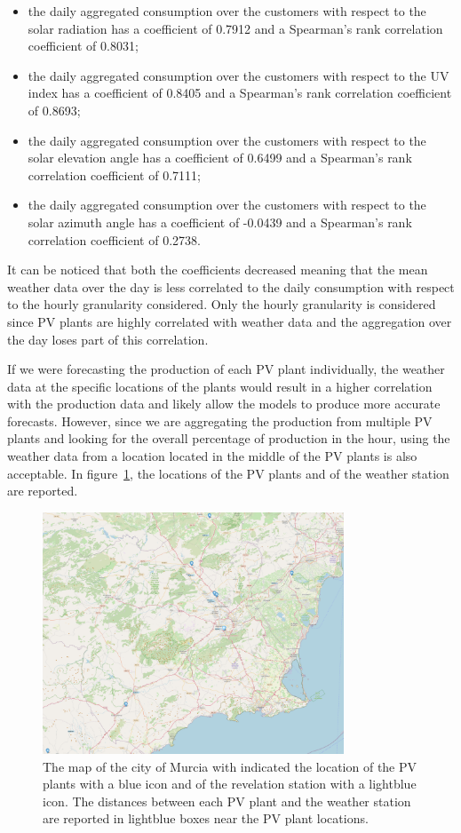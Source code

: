 \begin{itemize}
  \item the daily aggregated consumption over the customers with respect to the solar radiation has a coefficient of 0.7912 and a Spearman's rank correlation coefficient of 0.8031;
  \item the daily aggregated consumption over the customers with respect to the UV index has a coefficient of 0.8405 and a Spearman's rank correlation coefficient of 0.8693;
  \item the daily aggregated consumption over the customers with respect to the solar elevation angle has a coefficient of 0.6499 and a Spearman's rank correlation coefficient of 0.7111;
  \item the daily aggregated consumption over the customers with respect to the solar azimuth angle has a coefficient of -0.0439 and a Spearman's rank correlation coefficient of 0.2738.
\end{itemize}
It can be noticed that both the coefficients decreased meaning that the mean weather data over the day is less correlated to the daily consumption with respect to the hourly granularity considered.
Only the hourly granularity is considered since PV plants are highly correlated with weather data and the aggregation over the day loses part of this correlation.

If we were forecasting the production of each PV plant individually, the weather data at the specific locations of the plants would result in a higher correlation with the production data and likely allow the models to produce more accurate forecasts.
However, since we are aggregating the production from multiple PV plants and looking for the overall percentage of production in the hour, using the weather data from a location located in the middle of the PV plants is also acceptable.
In figure~\ref{fig:pvplantsmap}, the locations of the PV plants and of the weather station are reported.

\begin{figure}[H]
\centering
\includegraphics[width=0.8\textwidth]{images/production/pv_plants_map}
\caption{The map of the city of Murcia with indicated the location of the PV plants with a blue icon and of the revelation station with a lightblue icon. The distances between each PV plant and the weather station are reported in lightblue boxes near the PV plant locations.}
\label{fig:pvplantsmap}
\end{figure}

